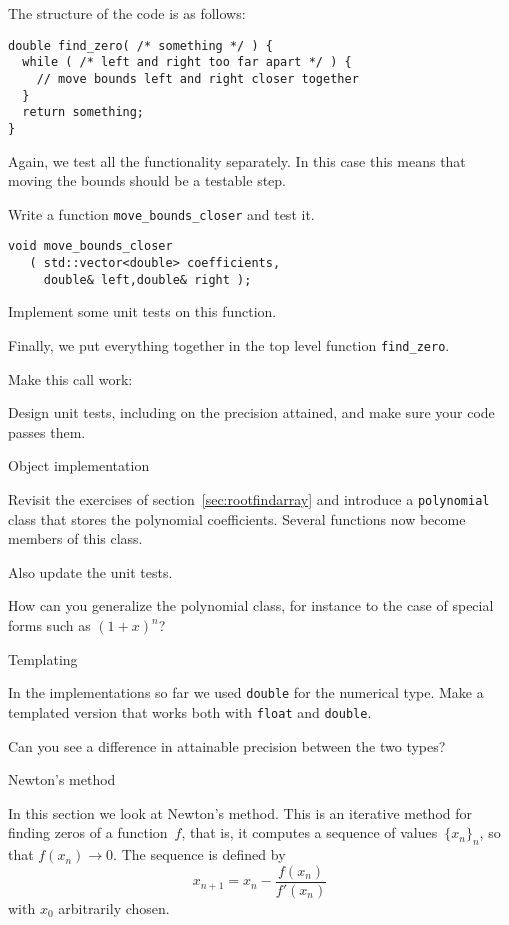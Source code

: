 The structure of the code is as follows:
\begin{lstlisting}
double find_zero( /* something */ ) {
  while ( /* left and right too far apart */ ) {
    // move bounds left and right closer together
  }
  return something;
}
\end{lstlisting}

Again, we test all the functionality separately.
In this case this means that moving the bounds
should be a testable step.

\begin{exercise}
  Write a function \lstinline+move_bounds_closer+
  and test it.
\begin{lstlisting}
void move_bounds_closer
   ( std::vector<double> coefficients,
     double& left,double& right );
\end{lstlisting}
  Implement some unit tests on this function.
\end{exercise}

Finally, we put everything together in the top level function \lstinline{find_zero}.

\begin{exercise}
  \label{ex:bisect-find}
  Make this call work:

  Design unit tests, including on the precision attained,
  and make sure your code passes them.
\end{exercise}

 {Object implementation}
\label{sec:rootfindclass}

Revisit the exercises of section~\ref{sec:rootfindarray}
and introduce a \lstinline{polynomial} class
that stores the polynomial coefficients.
Several functions now become members of this class.

Also update the unit tests.

How can you generalize the polynomial class, for instance
to the case of special forms such as $(1+x)^n$?

 {Templating}

In the implementations so far we used \lstinline{double}
for the numerical type.
Make a templated version that works both with \lstinline{float}
and \lstinline{double}.

Can you see a difference in attainable precision
between the two types?

 {Newton's method}
\label{sec:newton}


In this section we look at Newton's method.
This is an iterative method for finding zeros of a function~$f$,
that is, it computes a sequence of values~$\{x_n\}_n$,
so that $f(x_n)\rightarrow 0$.
The sequence is defined by
\[ x_{n+1} = x_n - \frac{f(x_n)}{f'(x_n)} \]
with $x_0$ arbitrarily chosen.

